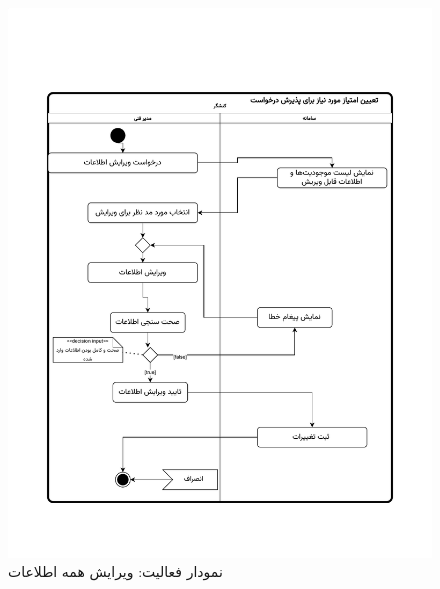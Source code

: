 \begin{figure}[ht!]
	\centering
	\includegraphics[scale=0.8]{figs/OOD-activity-42.pdf}
	\caption{نمودار فعالیت: ویرایش همه اطلاعات}
\end{figure}
\FloatBarrier
\newpage
